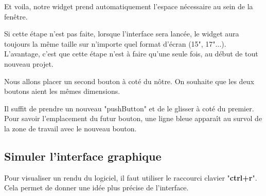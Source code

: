 

Et voila, notre widget prend automatiquement l'espace nécessaire au sein de la fenêtre. \newline





Si cette étape n'est pas faite, lorsque l'interface sera lancée, le widget aura toujours la même taille sur n'importe quel format d'écran (15", 17"...). L'avantage, c'est que cette étape n'est à faire qu'une seule fois, au début de tout nouveau projet. \newline

Nous allons placer un second bouton à coté du nôtre. On souhaite que les deux boutons aient les mêmes dimensions.

Il suffit de prendre un nouveau "pushButton" et de le glisser à coté du premier. Pour savoir l'emplacement du futur bouton, une ligne bleue apparaît au survol de la zone de travail avec le nouveau bouton.




{\color{red}}

\subsection{Simuler l'interface graphique}

Pour visualiser un rendu du logiciel, il faut utiliser le raccourci clavier "\textbf{ctrl+r}". \newline Cela permet de donner une idée plus précise de l'interface.




